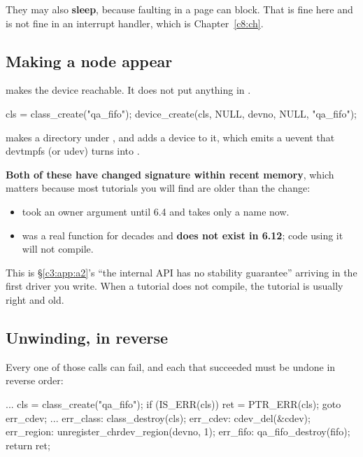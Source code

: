\noindent They may also \textbf{sleep}, because faulting in a page can block. That is fine here and
is not fine in an interrupt handler, which is Chapter~\ref{c8:ch}.

\subsection{Making a node appear}
\label{c5:app:a6}

 makes the device reachable. It does not put anything in .

\begin{ccode}
cls = class_create("qa_fifo");
device_create(cls, NULL, devno, NULL, "qa_fifo");
\end{ccode}

\noindent {} makes a directory under , and 
adds a device to it, which emits a uevent that devtmpfs (or udev) turns into .

\textbf{Both of these have changed signature within recent memory}, which matters because most
tutorials you will find are older than the change:
\begin{itemize}
  \item {} took an owner argument until 6.4 and takes only a name now.
  \item {} was a real function for decades and \textbf{does not exist in 6.12}; code
    using it will not compile.
\end{itemize}
This is \S\ref{c3:app:a2}'s ``the internal API has no stability guarantee'' arriving in the first
driver you write. When a tutorial does not compile, the tutorial is usually right and old.

\subsection{Unwinding, in reverse}
\label{c5:app:a7}

Every one of those calls can fail, and each that succeeded must be undone in reverse order:

\begin{ccode}
        ...
        cls = class_create("qa_fifo");
        if (IS_ERR(cls)) { ret = PTR_ERR(cls); goto err_cdev; }
        ...
err_class:  class_destroy(cls);
err_cdev:   cdev_del(&cdev);
err_region: unregister_chrdev_region(devno, 1);
err_fifo:   qa_fifo_destroy(fifo);
        return ret;
\end{ccode}

